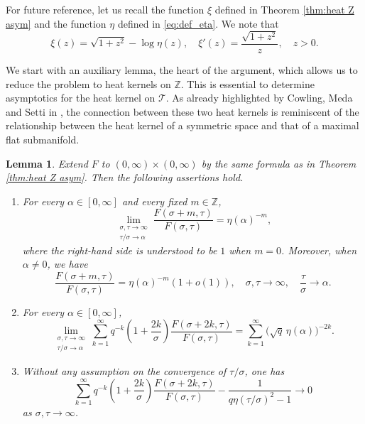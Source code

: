 \documentclass[10pt,a4paper]{amsart}
\renewcommand\mathcal{\mathscr}
\theoremstyle{plain}
\newtheorem{lemma}[theorem]{Lemma}
\theoremstyle{remark}
\theoremstyle{definition}
\begin{document}
For future reference, let us recall the function 
	 $\xi$ defined in Theorem \ref{thm:heat Z asym} and the function $\eta$ defined in \eqref{eq:def_eta}. We note that 
\begin{equation}\label{eq:xieta}
\xi(z)=\sqrt{1+z^2}-\log\eta(z),\quad \xi'(z)=\frac{\sqrt{1+z^2}}{z}, \quad z>0.
\end{equation}



We start with an auxiliary lemma, the heart of the argument, which allows us to reduce the problem to heat kernels on $\mathbb{Z}$. This is essential to determine asymptotics for the heat kernel on $\mathcal{T}$. As already highlighted by Cowling, Meda and Setti in \cite[p.4280]{CMS}, the connection between these two heat kernels is reminiscent of the relationship between the heat kernel of a symmetric space and that of a maximal flat submanifold. 

\begin{lemma}\label{lem:F-ratios-corrected}
Extend $F$ to $(0,\infty)\times(0,\infty)$ by the same formula as in
Theorem \ref{thm:heat Z asym}. Then the following assertions hold.

\begin{enumerate}
\item[\rm(i)]
For every $\alpha\in[0,\infty]$ and every fixed
$m\in \mathbb{Z}$,
\[
\lim_{\substack{\sigma,\tau\to\infty\\ \tau/\sigma\to\alpha}}
\frac{F(\sigma+m,\tau)}{F(\sigma,\tau)}
=
\eta(\alpha)^{-m},
\]
where the right-hand side is understood to be $1$ when $m=0$. Moreover, when $\alpha\neq0$, we have 
\[
\frac{F(\sigma+m,\tau)}{F(\sigma,\tau)}
=
\eta(\alpha)^{-m}(1+o(1)), \quad \sigma, \tau\to \infty, \quad \frac{\tau}{\sigma}\to \alpha.
\]
\item[\rm(ii)]
For every $\alpha\in[0,\infty]$,
\[
\lim_{\substack{\sigma,\tau\to\infty\\ \tau/\sigma\to\alpha}}
\sum_{k=1}^{\infty}
q^{-k}
\left(1+\frac{2k}{\sigma}\right)
\frac{F(\sigma+2k,\tau)}{F(\sigma,\tau)}
=
\sum_{k=1}^{\infty}
\bigl(\sqrt q\,\eta(\alpha)\bigr)^{-2k}.
\]

\item[\rm(iii)]
Without any assumption on the convergence of $\tau/\sigma$, one has
\[
\sum_{k=1}^{\infty}
q^{-k}
\left(1+\frac{2k}{\sigma}\right)
\frac{F(\sigma+2k,\tau)}{F(\sigma,\tau)}
-
\frac{1}{q\eta(\tau/\sigma)^2-1}
\to 0
\]
as $\sigma,\tau\to\infty$.

\end{enumerate}
\end{lemma}
\end{document}
